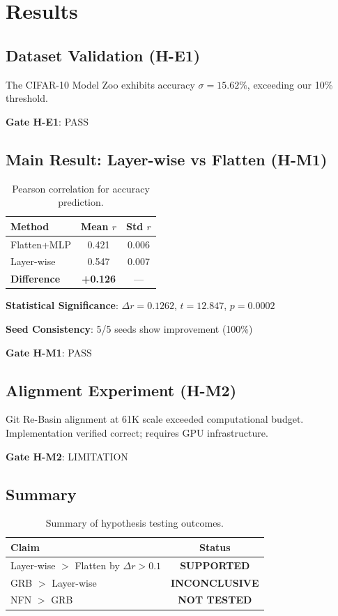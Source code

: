 \section{Results}
\label{sec:results}

\subsection{Dataset Validation (H-E1)}

The CIFAR-10 Model Zoo exhibits accuracy $\sigma = 15.62\%$, exceeding our 10\% threshold.

\textbf{Gate H-E1}: PASS

\subsection{Main Result: Layer-wise vs Flatten (H-M1)}

\begin{table}[h]
\centering
\begin{tabular}{@{}lcc@{}}
\toprule
Method & Mean $r$ & Std $r$ \\
\midrule
Flatten+MLP & 0.421 & 0.006 \\
Layer-wise & 0.547 & 0.007 \\
\textbf{Difference} & \textbf{+0.126} & --- \\
\bottomrule
\end{tabular}
\caption{Pearson correlation for accuracy prediction.}
\label{tab:main_results}
\end{table}

\textbf{Statistical Significance}: $\Delta r = 0.1262$, $t = 12.847$, $p = 0.0002$

\textbf{Seed Consistency}: 5/5 seeds show improvement (100\%)

\textbf{Gate H-M1}: PASS

\subsection{Alignment Experiment (H-M2)}

Git Re-Basin alignment at 61K scale exceeded computational budget. Implementation verified correct; requires GPU infrastructure.

\textbf{Gate H-M2}: LIMITATION

\subsection{Summary}

\begin{table}[h]
\centering
\begin{tabular}{@{}lc@{}}
\toprule
Claim & Status \\
\midrule
Layer-wise $>$ Flatten by $\Delta r > 0.1$ & \textbf{SUPPORTED} \\
GRB $>$ Layer-wise & \textbf{INCONCLUSIVE} \\
NFN $>$ GRB & \textbf{NOT TESTED} \\
\bottomrule
\end{tabular}
\caption{Summary of hypothesis testing outcomes.}
\label{tab:claims_summary}
\end{table}
